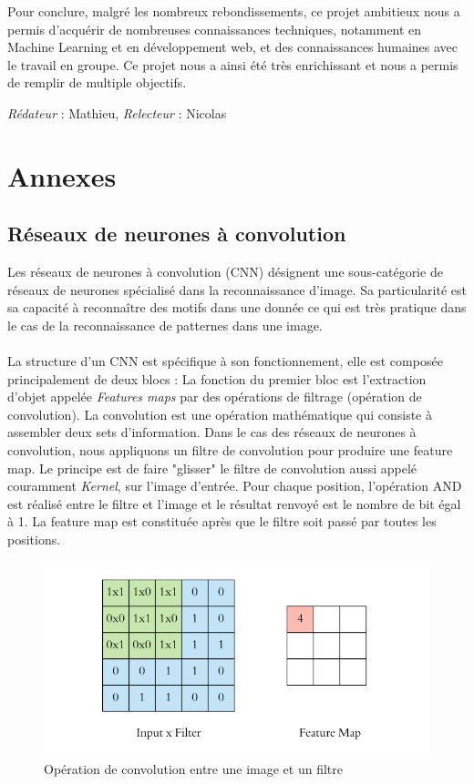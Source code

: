 \documentclass[oneside,a4paper,13pt]{article}
\begin{document}
\medbreak
Pour conclure, malgré les nombreux rebondissements, ce projet ambitieux nous a permis d'acquérir de nombreuses connaissances techniques, notamment en Machine Learning et en développement web, et des connaissances humaines avec le travail en groupe. Ce projet nous a ainsi été très enrichissant et nous a permis de remplir de multiple objectifs. 

\smallbreak\textit{Rédateur} : Mathieu, \textit{Relecteur} : Nicolas


\section{Annexes}
\subsection*{Réseaux de neurones à convolution}
Les réseaux de neurones à convolution (CNN) désignent une sous-catégorie de réseaux de neurones spécialisé dans la reconnaissance d'image. Sa particularité est sa capacité à reconnaître des motifs dans une donnée ce qui est très pratique dans le cas de la reconnaissance de patternes dans une image.\\ \\
La structure d'un CNN est spécifique à son fonctionnement, elle est composée principalement de deux blocs :
La fonction du premier bloc est l'extraction d'objet appelée \emph{Features maps} par des opérations de filtrage (opération de convolution). La convolution est une opération mathématique qui consiste à assembler deux sets d'information. Dans le cas des réseaux de neurones à convolution, nous appliquons un filtre de convolution pour produire une feature map. Le principe est de faire "glisser" le filtre de convolution aussi appelé couramment \emph{Kernel}, sur l'image d'entrée. Pour chaque position, l'opération AND est réalisé entre le filtre et l'image et le résultat renvoyé est le nombre de bit égal à 1. La feature map est constituée après que le filtre soit passé par toutes les positions.
\begin{figure}[H]
    \centering
        \includegraphics[width=0.7\linewidth]{Images/Convolution.PNG}
        \caption{Opération de convolution entre une image et un filtre}
        \label{fig:my_label}
\end{figure}
\end{document}

